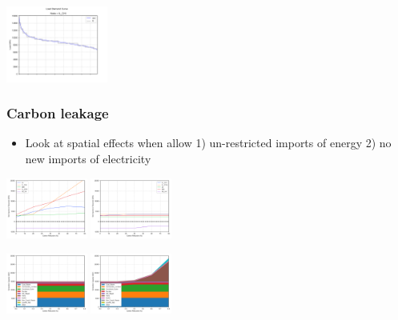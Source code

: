 \documentclass[xcolor=dvipsnames]{beamer}
\begin{document}
\begin{frame}
  \includegraphics[width=0.25\textwidth]{includes/LDC_node_IL_CHI.png}

\end{frame}


\begin{frame}
  \frametitle{Carbon leakage}

\begin{itemize}
  \item Look at spatial effects when allow 1) un-restricted imports of energy 2) no new imports of electricity
\end{itemize}



  \includegraphics[width=0.2\textwidth]{includes/carbonleak_net_imports.png}
  \includegraphics[width=0.2\textwidth]{includes/no_carbonleak_net_imports.png}

  \includegraphics[width=0.2\textwidth]{includes/carbonleak_WI_capacity.png}
  \includegraphics[width=0.2\textwidth]{includes/no_carbonleak_WI_capacity.png}


\end{frame}
\end{document}
